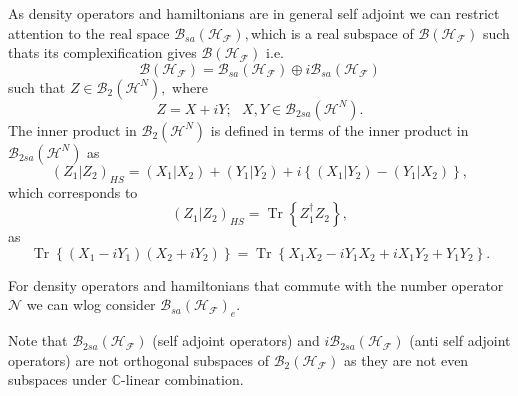 \documentclass[aps,preprint]{revtex4}%
\begin{document}
As density operators and hamiltonians are in general self adjoint we can
restrict attention to the real space $\mathcal{B}_{sa}\left(  \mathcal{H}%
_{\mathcal{F}}\right)  ,$which is a real subspace of $\mathcal{B}\left(
\mathcal{H}_{\mathcal{F}}\right)  $ such thats its complexification gives
$\mathcal{B}\left(  \mathcal{H}_{\mathcal{F}}\right)  $ i.e.
\begin{equation}
\mathcal{B}\left(  \mathcal{H}_{\mathcal{F}}\right)  =\mathcal{B}_{sa}\left(
\mathcal{H}_{\mathcal{F}}\right)  \oplus i\mathcal{B}_{sa}\left(
\mathcal{H}_{\mathcal{F}}\right)
\end{equation}
such that $Z\in\mathcal{B}_{2}\left(  \mathcal{H}^{N}\right)  ,$ where
\begin{equation}
Z=X+iY;\text{ }X,Y\in\mathcal{B}_{2sa}\left(  \mathcal{H}^{N}\right)  .
\end{equation}
The inner product in $\mathcal{B}_{2}\left(  \mathcal{H}^{N}\right)  $ is
defined in terms of the inner product in $\mathcal{B}_{2sa}\left(
\mathcal{H}^{N}\right)  $ as
\begin{equation}
\left(  Z_{1}\left\vert Z_{2}\right.  \right)  _{HS}=\left(  X_{1}\left\vert
X_{2}\right.  \right)  +\left(  Y_{1}\left\vert Y_{2}\right.  \right)
+i\left\{  \left(  X_{1}\left\vert Y_{2}\right.  \right)  -\left(
Y_{1}\left\vert X_{2}\right.  \right)  \right\}  ,
\end{equation}
which corresponds to
\begin{equation}
\left(  Z_{1}\left\vert Z_{2}\right.  \right)  _{HS}=\operatorname{Tr}\left\{
Z_{1}^{\dagger}Z_{2}\right\}  ,
\end{equation}
as%
\begin{equation}
\operatorname{Tr}\left\{  \left(  X_{1}-iY_{1}\right)  \left(  X_{2}%
+iY_{2}\right)  \right\}  =\operatorname{Tr}\left\{  X_{1}X_{2}-iY_{1}%
X_{2}+iX_{1}Y_{2}+Y_{1}Y_{2}\right\}  .
\end{equation}


For density operators and hamiltonians that commute with the number operator
$\mathcal{N}$ we can wlog consider $\mathcal{B}_{sa}\left(  \mathcal{H}%
_{\mathcal{F}}\right)  _{e}.$

Note that $\mathcal{B}_{2sa}\left(  \mathcal{H}_{\mathcal{F}}\right)  $ (self
adjoint operators) and $i\mathcal{B}_{2sa}\left(  \mathcal{H}_{\mathcal{F}%
}\right)  $ (anti self adjoint operators) are not orthogonal subspaces of
$\mathcal{B}_{2}\left(  \mathcal{H}_{\mathcal{F}}\right)  $ as they are not
even subspaces under $\mathbb{C}$-linear combination.
\end{document}
